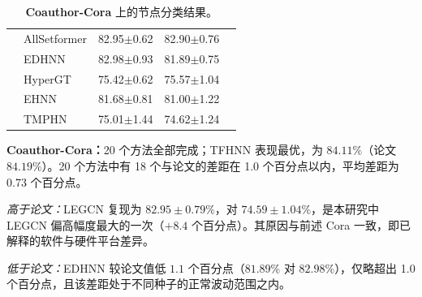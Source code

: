\documentclass[11pt,a4paper]{article}
\begin{document}
\begin{table}[H]
\begin{tabular}{llccc}
		 & AllSetformer      & 82.95$\pm$0.62   & 82.90$\pm$0.76   &  \\
		 & EDHNN             & 82.98$\pm$0.93   & 81.89$\pm$0.75   &  \\
		 & HyperGT           & 75.42$\pm$0.62   & 75.57$\pm$1.04   &  \\
		 & EHNN              & 81.68$\pm$0.81   & 81.00$\pm$1.22   &  \\
		 & TMPHN             & 75.01$\pm$1.44   & 74.62$\pm$1.24   &  \\
		\bottomrule
	\end{tabular}
	\caption{\textbf{Coauthor-Cora} 上的节点分类结果。}
\end{table}

\par\smallskip
\noindent\textbf{Coauthor-Cora：}20 个方法全部完成；TFHNN 表现最优，为 $84.11\%$（论文 $84.19\%$）。20 个方法中有 18 个与论文的差距在 1.0 个百分点以内，平均差距为 0.73 个百分点。

\noindent\textit{高于论文：}LEGCN 复现为 $82.95\pm0.79\%$，对 $74.59\pm1.04\%$，是本研究中 LEGCN 偏高幅度最大的一次（$+8.4$ 个百分点）。其原因与前述 Cora 一致，即已解释的软件与硬件平台差异。

\noindent\textit{低于论文：}EDHNN 较论文值低 $1.1$ 个百分点（$81.89\%$ 对 $82.98\%$），仅略超出 1.0 个百分点，且该差距处于不同种子的正常波动范围之内。
\end{document}
